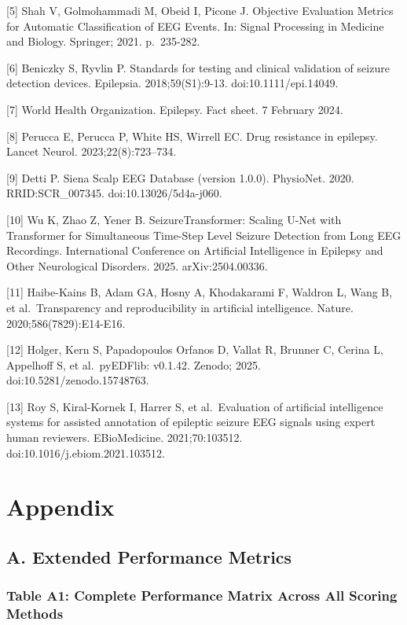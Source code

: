 \documentclass[
]{article}
\begin{document}
{[}5{]} Shah V, Golmohammadi M, Obeid I, Picone J. Objective Evaluation
Metrics for Automatic Classification of EEG Events. In: Signal
Processing in Medicine and Biology. Springer; 2021. p.~235-282.

{[}6{]} Beniczky S, Ryvlin P. Standards for testing and clinical
validation of seizure detection devices. Epilepsia. 2018;59(S1):9-13.
doi:10.1111/epi.14049.

{[}7{]} World Health Organization. Epilepsy. Fact sheet. 7 February
2024.

{[}8{]} Perucca E, Perucca P, White HS, Wirrell EC. Drug resistance in
epilepsy. Lancet Neurol. 2023;22(8):723--734.

{[}9{]} Detti P. Siena Scalp EEG Database (version 1.0.0). PhysioNet.
2020. RRID:SCR\_007345. doi:10.13026/5d4a-j060.

{[}10{]} Wu K, Zhao Z, Yener B. SeizureTransformer: Scaling U-Net with
Transformer for Simultaneous Time-Step Level Seizure Detection from Long
EEG Recordings. International Conference on Artificial Intelligence in
Epilepsy and Other Neurological Disorders. 2025. arXiv:2504.00336.

{[}11{]} Haibe-Kains B, Adam GA, Hosny A, Khodakarami F, Waldron L, Wang
B, et al.~Transparency and reproducibility in artificial intelligence.
Nature. 2020;586(7829):E14-E16.

{[}12{]} Holger, Kern S, Papadopoulos Orfanos D, Vallat R, Brunner C,
Cerina L, Appelhoff S, et al.~pyEDFlib: v0.1.42. Zenodo; 2025.
doi:10.5281/zenodo.15748763.

{[}13{]} Roy S, Kiral-Kornek I, Harrer S, et al.~Evaluation of
artificial intelligence systems for assisted annotation of epileptic
seizure EEG signals using expert human reviewers. EBioMedicine.
2021;70:103512. doi:10.1016/j.ebiom.2021.103512.

\hypertarget{appendix}{%
\section{Appendix}\label{appendix}}

\hypertarget{a.-extended-performance-metrics}{%
\subsection{A. Extended Performance
Metrics}\label{a.-extended-performance-metrics}}

\hypertarget{table-a1-complete-performance-matrix-across-all-scoring-methods}{%
\subsubsection{Table A1: Complete Performance Matrix Across All Scoring
Methods}\label{table-a1-complete-performance-matrix-across-all-scoring-methods}}
\end{document}

